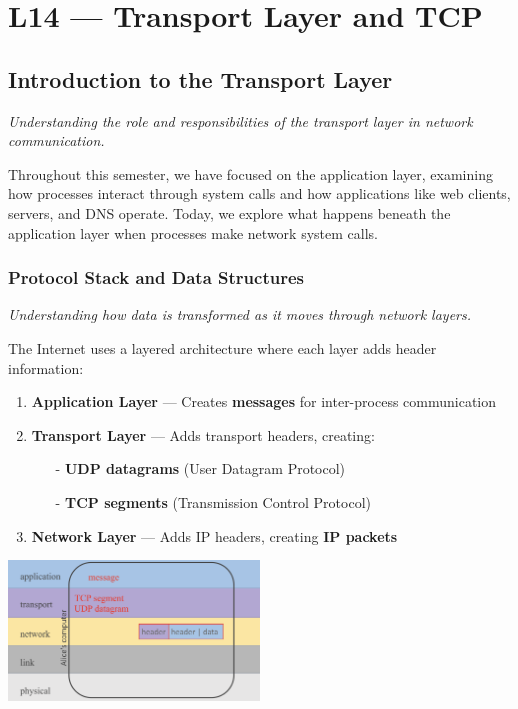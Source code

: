 \documentclass[../../compsys.tex]{subfiles}
\begin{document}
\raggedbottom
\chapter{L14 — Transport Layer and TCP}
\vfill
\raggedbottom

\section{Introduction to the Transport Layer}
\textit{Understanding the role and responsibilities of the transport layer in network communication.}

Throughout this semester, we have focused on the application layer, examining how processes interact through system calls and how applications like web clients, servers, and DNS operate. Today, we explore what happens beneath the application layer when processes make network system calls.

\subsection{Protocol Stack and Data Structures}
\textit{Understanding how data is transformed as it moves through network layers.}

The Internet uses a layered architecture where each layer adds header information:

\begin{enumerate}
  \item \textbf{Application Layer} — Creates \textbf{messages} for inter-process communication
  \item \textbf{Transport Layer} — Adds transport headers, creating:
  \begin{itemize}
    \item[-] \textbf{UDP datagrams} (User Datagram Protocol)
    \item[-] \textbf{TCP segments} (Transmission Control Protocol)
  \end{itemize}
  \item \textbf{Network Layer} — Adds IP headers, creating \textbf{IP packets}
\end{enumerate}

\begin{center}
  \includegraphics[width=0.5\textwidth]{images/layers.png}
\end{center}
\end{document}
